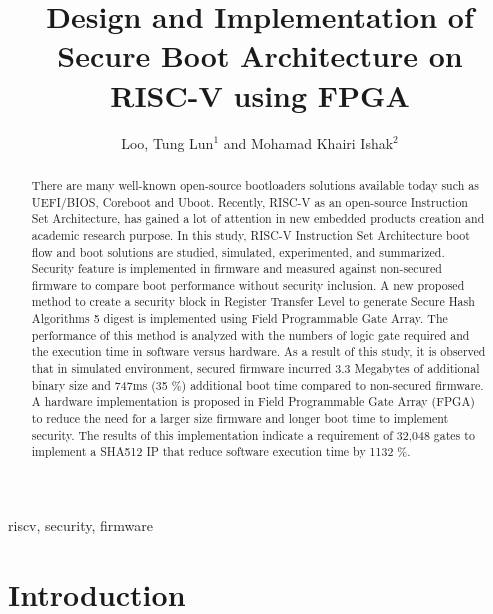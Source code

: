\documentclass[review]{elsarticle}
\begin{document}
\begin{frontmatter}

\title{Design and Implementation of Secure Boot Architecture on RISC-V using FPGA}

\author{%
Loo, Tung Lun$^{1}$ and Mohamad Khairi Ishak$^{2}$}
\address{$^{1}$School of Electrical and Electronic Engineering, Universiti Sains Malaysia, 14300, Nibong Tebal, Pulau Pinang, Malaysia.\\
$^{2}$School of Electrical and Electronic Engineering, Universiti Sains Malaysia, 14300, Nibong Tebal, Pulau Pinang, Malaysia.\\}

\begin{abstract}
There are many well-known open-source bootloaders solutions available today such as UEFI/BIOS, Coreboot and Uboot.
Recently, RISC-V as an open-source Instruction Set Architecture, has gained a lot of attention in new embedded products
creation and academic research purpose. In this study, RISC-V Instruction Set Architecture boot flow and
boot solutions are studied, simulated, experimented, and summarized. Security feature is implemented in firmware and
measured against non-secured firmware to compare boot performance without security inclusion. A new proposed method
to create a security block in Register Transfer Level to generate Secure Hash Algorithms 5 digest is implemented using Field
Programmable Gate Array. The performance of this method is analyzed with the numbers of logic gate required and the
execution time in software versus hardware. As a result of this study, it is observed that in simulated environment, secured
firmware incurred 3.3 Megabytes of additional binary size and 747ms (35 \%) additional boot time compared to non-secured
firmware. A hardware implementation is proposed in Field Programmable Gate Array (FPGA) to reduce the need for a larger
size firmware and longer boot time to implement security. The results of this implementation indicate a requirement of
32,048 gates to implement a SHA512 IP that reduce software execution time by 1132 \%.
\end{abstract}

\begin{keyword}
riscv, security, firmware
\end{keyword}

\end{frontmatter}

\section{Introduction}
\end{document}
